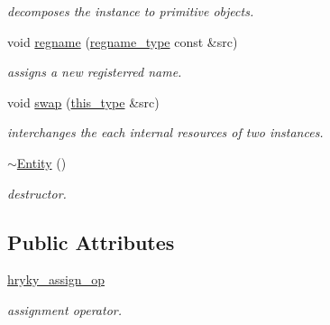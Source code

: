 \begin{DoxyCompactItemize}
\begin{DoxyCompactList}\small\item\em decomposes the instance to primitive objects. \end{DoxyCompactList}\item 
void \hyperlink{classhryky_1_1uri_1_1host_1_1_entity_af26c55ad20947d8aa771302034f73cc4}{regname} (\hyperlink{classhryky_1_1uri_1_1regname_1_1_entity}{regname\-\_\-type} const \&src)
\begin{DoxyCompactList}\small\item\em assigns a new registerred name. \end{DoxyCompactList}\item 
\hypertarget{classhryky_1_1uri_1_1host_1_1_entity_a90b15b7c270cd2dc1a8d72a27009c6af}{void \hyperlink{classhryky_1_1uri_1_1host_1_1_entity_a90b15b7c270cd2dc1a8d72a27009c6af}{swap} (\hyperlink{classhryky_1_1uri_1_1host_1_1_entity_ac8c50881bac165d457a3aa36480b5158}{this\-\_\-type} \&src)}\label{classhryky_1_1uri_1_1host_1_1_entity_a90b15b7c270cd2dc1a8d72a27009c6af}

\begin{DoxyCompactList}\small\item\em interchanges the each internal resources of two instances. \end{DoxyCompactList}\item 
\hypertarget{classhryky_1_1uri_1_1host_1_1_entity_ad5424d954bcd81a3ed77bd46c7ea45c3}{\hyperlink{classhryky_1_1uri_1_1host_1_1_entity_ad5424d954bcd81a3ed77bd46c7ea45c3}{$\sim$\-Entity} ()}\label{classhryky_1_1uri_1_1host_1_1_entity_ad5424d954bcd81a3ed77bd46c7ea45c3}

\begin{DoxyCompactList}\small\item\em destructor. \end{DoxyCompactList}\end{DoxyCompactItemize}
\subsection*{Public Attributes}
\begin{DoxyCompactItemize}
\item 
\hypertarget{classhryky_1_1uri_1_1host_1_1_entity_a62770928c296788f205de6efbd497ace}{\hyperlink{classhryky_1_1uri_1_1host_1_1_entity_a62770928c296788f205de6efbd497ace}{hryky\-\_\-assign\-\_\-op}}\label{classhryky_1_1uri_1_1host_1_1_entity_a62770928c296788f205de6efbd497ace}

\begin{DoxyCompactList}\small\item\em assignment operator. \end{DoxyCompactList}\end{DoxyCompactItemize}


